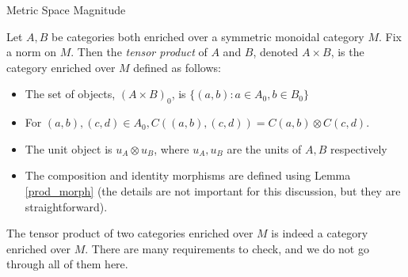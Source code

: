 \documentclass[12pt]{pom_thesis}
\begin{document}
\begin{chapter}{Metric Space Magnitude}
\begin{defn}
Let $A,B$ be categories both enriched over a symmetric monoidal category $M$. Fix a norm on $M$. Then the \emph{tensor product} of $A$ and $B$, denoted $A \times B$, is the category enriched over $M$ defined as follows:
\begin{itemize}
\item The set of objects, $(A \times B)_0$, is $\{(a,b):a \in A_0, b \in  B_0\}$
\item For $(a,b), (c,d) \in A_0, C((a,b), (c,d)) = C(a,b) \otimes C(c,d)$.
\item The unit object is $u_A \otimes u_B$, where $u_A, u_B$ are the units of $A,B$ respectively
\item The composition and identity morphisms are defined using Lemma \ref{prod_morph} (the details are not important for this discussion, but they are straightforward).
\end{itemize}
\begin{rmk}
The tensor product of two categories enriched over $M$ is indeed a category enriched over $M$. There are many requirements to check, and we do not go through all of them here.
\end{rmk}
\end{defn}


\end{chapter}
\end{document}
